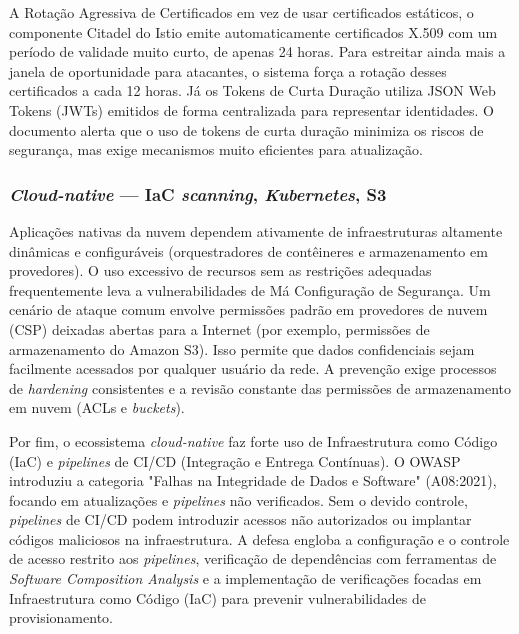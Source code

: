 {A Rotação Agressiva de Certificados em vez de usar certificados estáticos, o componente Citadel do Istio emite automaticamente certificados X.509 com um período de validade muito curto, de apenas 24 horas. Para estreitar ainda mais a janela de oportunidade para atacantes, o sistema força a rotação desses certificados a cada 12 horas. Já os Tokens de Curta Duração utiliza JSON Web Tokens (JWTs) emitidos de forma centralizada para representar identidades. O documento alerta que o uso de tokens de curta duração minimiza os riscos de segurança, mas exige mecanismos muito eficientes para atualização.

\color{red}
\subsubsection{
    \textit{Cloud-native} — IaC \textit{scanning}, \textit{Kubernetes}, S3
}\label{sec:cloud_native}

Aplicações nativas da nuvem dependem ativamente de infraestruturas altamente dinâmicas e configuráveis (orquestradores de contêineres e armazenamento em provedores). O uso excessivo de recursos sem as restrições adequadas frequentemente leva a vulnerabilidades de Má Configuração de Segurança. Um cenário de ataque comum envolve permissões padrão em provedores de nuvem (CSP) deixadas abertas para a Internet (por exemplo, permissões de armazenamento do Amazon S3). Isso permite que dados confidenciais sejam facilmente acessados por qualquer usuário da rede. A prevenção exige processos de \textit{hardening} consistentes e a revisão constante das permissões de armazenamento em nuvem (ACLs e \textit{buckets}).

Por fim, o ecossistema \textit{cloud-native} faz forte uso de Infraestrutura como Código (IaC) e \textit{pipelines} de CI/CD (Integração e Entrega Contínuas). O OWASP introduziu a categoria "Falhas na Integridade de Dados e Software" (A08:2021), focando em atualizações e \textit{pipelines} não verificados. Sem o devido controle, \textit{pipelines} de CI/CD podem introduzir acessos não autorizados ou implantar códigos maliciosos na infraestrutura. A defesa engloba a configuração e o controle de acesso restrito aos \textit{pipelines}, verificação de dependências com ferramentas de \textit{Software Composition Analysis} e a implementação de verificações focadas em Infraestrutura como Código (IaC) para prevenir vulnerabilidades de provisionamento.

}